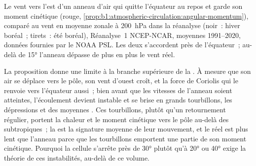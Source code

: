 \begin{omfigure}

{\small Le vent vers l'est d'un anneau d'air qui quitte l'équateur au repos et garde
son moment cinétique (rouge, \cref{prop:b1:atmospheric-circulation:angular-momentum}),
comparé au vent en moyenne zonale à \qty{200}{hPa} dans la réanalyse (noir~: hiver
boréal~; tirets~: été boréal), Réanalyse~1 NCEP-NCAR, moyennes 1991--2020, données
fournies par le NOAA PSL. Les deux s'accordent près de l'équateur~; au-delà de \ang{15}
l'anneau dépasse de plus en plus le vent réel.}
\label{fig:b1:atmospheric-circulation:angular-momentum}
\end{omfigure}

La proposition donne une limite à la branche supérieure de la . À mesure que son air se déplace
vers le pôle, son vent d'ouest croît, et la force de Coriolis qui le renvoie
vers l'équateur aussi~; bien avant que les vitesses de l'anneau soient atteintes, l'écoulement devient
instable et se brise en grands tourbillons, les dépressions et  des
moyennes . Ces tourbillons, plutôt qu'un retournement régulier, portent la chaleur et le
moment cinétique vers le pôle au-delà des subtropiques~; la  est la signature
moyenne de leur mouvement, et le  réel est plus lent que l'anneau parce que les
tourbillons emportent une partie de son moment cinétique. Pourquoi la cellule s'arrête près de \ang{30}
plutôt qu'à \ang{20} ou \ang{40} exige la théorie de ces instabilités,
au-delà de ce volume.

